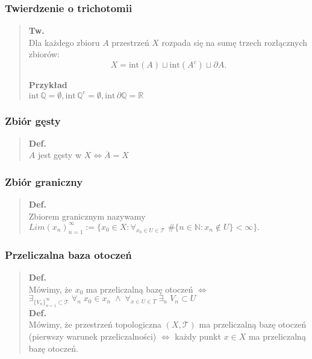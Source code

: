 \documentclass[10pt,a4paper]{article}
\begin{document}
{    \subsubsection*{Twierdzenie o trichotomii}
    \begin{quote} 
    \textbf{Tw.}\\
    Dla każdego zbioru $A$ przestrzeń $X$ rozpada się na sumę trzech rozłącznych zbiorów: \\
    $$X = \mathrm{int}(A) \sqcup \mathrm{int}(A^c) \sqcup \partial A.$$

    \textbf{Przykład}\\
    $\mathrm{int}\, \mathbb{Q} = \emptyset, \mathrm{int}\, \mathbb{Q}^c = \emptyset, \mathrm{int}\, \partial \mathbb{Q} = \mathbb{R}$
    \end{quote}


    \subsubsection*{Zbiór gęsty}
    \begin{quote}
    \textbf{Def.}\\
        $A$ jest gęsty w $X \iff \overline{A} = X$
    \end{quote}

    \subsubsection*{Zbiór graniczny}
    \begin{quote}
    \textbf{Def.}\\
    Zbiorem granicznym nazywamy \(Lim(x_n)_{n=1}^\infty := \{x_0 \in X: \forall_{x_0 \in U \in \mathcal{T}} \; \#\{n \in \mathbb{N}: x_n \notin U\} < \infty\}. \)
    \end{quote}

    \subsubsection*{Przeliczalna baza otoczeń}
    \begin{quote}
    \textbf{Def.}\\
    Mówimy, że $x_0$ ma przeliczalną bazę otoczeń $\iff$ $\exists_{\{V_n\}_{n=1}^{\infty} \subset \mathcal{T}} \; \forall_{n} \; x_0 \in x_n \; \wedge \; \forall_{x \in U \in T} \; \exists_n \; V_n \subset U$\\

    \textbf{Def.}\\
    Mówimy, że przestrzeń topologiczna $(X, \mathcal{T})$ ma przeliczalną bazę otoczeń (pierwszy warunek przeliczalności) $\iff$ każdy punkt $x \in X$ ma przeliczalną bazę otoczeń.\\


\end{quote}}
\end{document}
